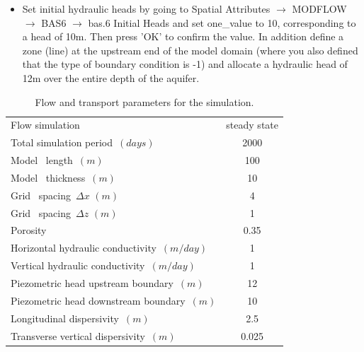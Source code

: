\begin{itemize}
This will define the type of boundary condition to a fixed head boundary 
at the inflow and outflow model boundaries.
The hydraulic head at these grid cells will therefore remain unchanged
over the whole simulation period. It will remain at the same values that we will now define as initial heads.  

\item Set initial hydraulic heads by going to {\color{blue}Spatial Attributes} $\rightarrow$ {\color{blue}MODFLOW} $\rightarrow$ {\color{blue}BAS6} $\rightarrow$ {\color{blue}bas.6 Initial Heads} and set {\color{blue}one\_value} 
to 10, corresponding to a head of 10m. Then press {\color{blue}'OK'} to confirm the value. In addition
define a zone (line) at the upstream end of the model domain (where you also defined that the type of 
boundary condition is -1) and allocate a hydraulic head of 12m over the entire depth of the aquifer. 


\end{itemize}

\begin{table}[t]
\caption{Flow and transport parameters for the simulation.}
\begin{center}
\begin{tabular}{lc} 
\toprule
Flow simulation                     & steady state \\
Total simulation period\ $ (days)      $         &  2000            \\
Model \  length\ $ (m)      $         &  100            \\
Model \  thickness\ $(m)$                        &  10            \\
Grid \ spacing\ $\Delta x $ $(m)$                &    4            \\
Grid \ spacing\ $\Delta z $ $(m)$                &    1            \\
Porosity\     $            $         &  0.35           \\
Horizontal hydraulic conductivity\ $(m/day)$               &  1         \\ 
Vertical   hydraulic conductivity\ $(m/day)$               &  1         \\ 
Piezometric head upstream boundary\ $(m)          $         &  12           \\ 
Piezometric head downstream boundary\ $(m)        $         &  10           \\ 
Longitudinal dispersivity\ $(m)         $         &  2.5          \\ 
Transverse  vertical dispersivity\ $(m)         $         &  0.025          \\ 
\bottomrule
\end{tabular}
\label{ex3_flow}
\end{center}
\end{table}

